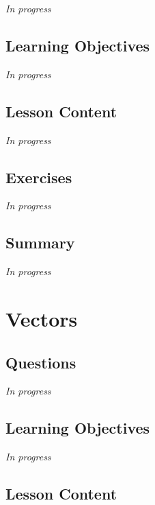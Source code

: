 \documentclass[
  letterpaper,
  DIV=11,
  numbers=noendperiod]{scrreprt}
\begin{document}
\emph{In progress}

\hypertarget{learning-objectives-7}{%
\section{Learning Objectives}\label{learning-objectives-7}}

\emph{In progress}

\hypertarget{lesson-content-7}{%
\section{Lesson Content}\label{lesson-content-7}}

\emph{In progress}

\hypertarget{exercises-7}{%
\section{Exercises}\label{exercises-7}}

\emph{In progress}

\hypertarget{summary-8}{%
\section{Summary}\label{summary-8}}

\emph{In progress}


\hypertarget{sec-vectors}{%
\chapter{Vectors}\label{sec-vectors}}

\hypertarget{questions-8}{%
\section{Questions}\label{questions-8}}

\emph{In progress}

\hypertarget{learning-objectives-8}{%
\section{Learning Objectives}\label{learning-objectives-8}}

\emph{In progress}

\hypertarget{lesson-content-8}{%
\section{Lesson Content}\label{lesson-content-8}}
\end{document}
